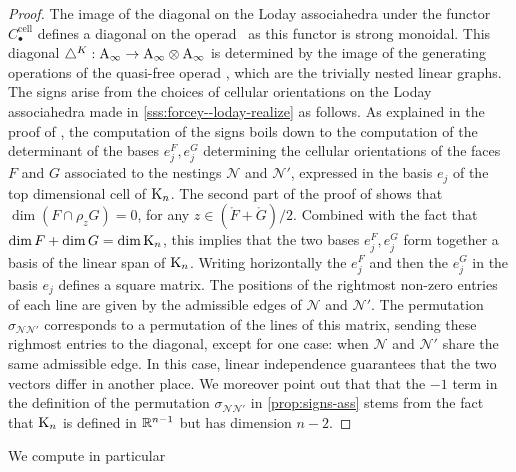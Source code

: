 \documentclass[10pt]{amsart}
\theoremstyle{remark}
\begin{document}
\begin{proof}
The image of the diagonal on the Loday associahedra under the functor $C_\bullet^{\mathrm{cell}}$ defines a diagonal on the operad \Ainf\ as this functor is strong monoidal. 
This diagonal $\triangle^{K} : \mathrm{A}_\infty \rightarrow \mathrm{A}_\infty \otimes \mathrm{A}_\infty$ is determined by the image of the generating operations of the quasi-free operad \Ainf , which are the trivially nested linear graphs. 
The signs arise from the choices of cellular orientations on the Loday associahedra made in \cref{sss:forcey--loday-realize} as follows. 
As explained in the proof of \cite[Proposition 4.27]{LA21}, the computation of the signs boils down to the computation of the determinant of the bases $e_j^{F}, e_j^{G}$ determining the cellular orientations of the faces $F$ and $G$ associated to the nestings $\mathcal{N}$ and $\mathcal{N}'$, expressed in the basis $e_j$ of the top dimensional cell of $\mathrm{K}_n$. 
The second part of the proof of \cite[Theorem 1.26]{LA21} shows that  $\dim(F\cap \rho_z G)=0$, for any $z \in (\mathring F+ \mathring G)/2$.
Combined with the fact that $\dim F + \dim G = \dim \mathrm{K}_n$, this implies that the two bases $e_j^F, e_j^G$ form together a basis of the linear span of $\mathrm{K}_n$. 
Writing horizontally the $e_j^F$ and then the $e_j^G$ in the basis $e_j$ defines a square matrix.
The positions of the rightmost non-zero entries of each line are given by the admissible edges of $\mathcal{N}$ and $\mathcal{N}'$. 
The permutation $\sigma_{\mathcal{N}\mathcal{N}'}$ corresponds to a permutation of the lines of this matrix, sending these righmost entries to the diagonal, except for one case: when $\mathcal{N}$ and $\mathcal{N}'$ share the same admissible edge. 
In this case, linear independence guarantees that the two vectors differ in another place.
We moreover point out that that the $-1$ term in the definition of the permutation $\sigma_{\mathcal{N}\mathcal{N}'}$ in \cref{prop:signs-ass} stems from the fact that $\mathrm{K}_n$ is defined in $\mathbb{R}^{n-1}$ but has dimension $n-2$. 
\end{proof}

We compute in particular 
\end{document}
